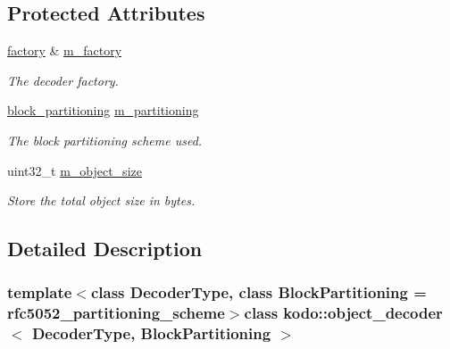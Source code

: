 \subsection*{Protected Attributes}
\begin{DoxyCompactItemize}
\item 
\hypertarget{classkodo_1_1object__decoder_a0979abab4b971f4127265764b8107f3e}{\hyperlink{classkodo_1_1object__decoder_acd1470f04f34ae297bcc5a6e625f38a2}{factory} \& \hyperlink{classkodo_1_1object__decoder_a0979abab4b971f4127265764b8107f3e}{m\-\_\-factory}}\label{classkodo_1_1object__decoder_a0979abab4b971f4127265764b8107f3e}

\begin{DoxyCompactList}\small\item\em The decoder factory. \end{DoxyCompactList}\item 
\hypertarget{classkodo_1_1object__decoder_a0018d88cb046b911df1fbb69790a9635}{\hyperlink{classkodo_1_1object__decoder_a4c945b71219089d00d652f146a3dd1fa}{block\-\_\-partitioning} \hyperlink{classkodo_1_1object__decoder_a0018d88cb046b911df1fbb69790a9635}{m\-\_\-partitioning}}\label{classkodo_1_1object__decoder_a0018d88cb046b911df1fbb69790a9635}

\begin{DoxyCompactList}\small\item\em The block partitioning scheme used. \end{DoxyCompactList}\item 
\hypertarget{classkodo_1_1object__decoder_acd436a34ade06db54dc213e30a86f279}{uint32\-\_\-t \hyperlink{classkodo_1_1object__decoder_acd436a34ade06db54dc213e30a86f279}{m\-\_\-object\-\_\-size}}\label{classkodo_1_1object__decoder_acd436a34ade06db54dc213e30a86f279}

\begin{DoxyCompactList}\small\item\em Store the total object size in bytes. \end{DoxyCompactList}\end{DoxyCompactItemize}


\subsection{Detailed Description}
\subsubsection*{template$<$class Decoder\-Type, class Block\-Partitioning = rfc5052\-\_\-partitioning\-\_\-scheme$>$class kodo\-::object\-\_\-decoder$<$ Decoder\-Type, Block\-Partitioning $>$}

